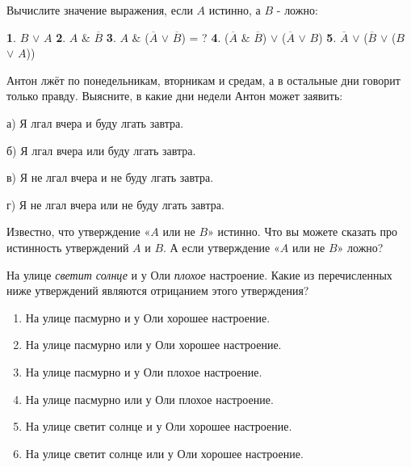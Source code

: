 \begin{ex}
    Вычислите значение выражения, если $A$ истинно, а $B$ - ложно:
    \par
    \textbf{1}. $B$ $\vee$ $A$ \hfill 
    \textbf{2}. $A$ $\&$ $\overline{B}$ \hfill
    \textbf{3}. $A$ $\&$ ($\overline{A}$ $\vee$ $\overline{B}$) = ? \hfill
    \textbf{4}. ($\overline{A}$ $\&$ $\overline{B}$) $\vee$ ($\overline{A}$ $\vee$ $B$) \hfill
    \textbf{5}. $\overline{A}$ $\vee$ ($\overline{B}$ $\vee$ ($B$ $\vee$ $A$))
\end{ex}

\begin{thm}
    Антон лжёт по понедельникам, вторникам и средам, а в остальные дни говорит только правду. Выясните, в какие дни недели Антон может заявить:
    \par а) Я лгал вчера и буду лгать завтра.
    \par б) Я лгал вчера или буду лгать завтра. 
    \par в) Я не лгал вчера и не буду лгать завтра.
    \par г) Я не лгал вчера или не буду лгать завтра.
\end{thm}

\begin{thm}
    Известно, что утверждение «$A$ или не $B$» истинно. Что вы можете сказать про истинность утверждений $A$ и $B$. А если утверждение «$A$ или не $B$» ложно?
\end{thm}

\begin{thm}
    На улице \textit{светит солнце} и у Оли \textit{плохое} настроение. Какие из перечисленных ниже утверждений являются отрицанием этого утверждения?
    \begin{enumerate}[label=\asbuk*), ref=\asbuk*]
        \item На улице пасмурно и у Оли хорошее настроение.
        \item На улице пасмурно или у Оли хорошее настроение.
        \item На улице пасмурно и у Оли плохое настроение.
        \item На улице пасмурно или у Оли плохое настроение.
        \item На улице светит солнце и у Оли хорошее настроение.
        \item На улице светит солнце или у Оли хорошее настроение.
    \end{enumerate}
\end{thm}

